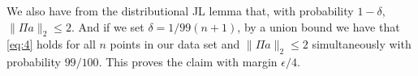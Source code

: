 \documentclass[11pt]{article}
\newcommand{\bv}[1]{\mathbf{#1}}
\begin{document}
	
	We also have from the distributional JL lemma that, with probability $1 - \delta$, $\|\Pi a\|_2 \leq 2$. And if we set $\delta = 1/99(n+1)$, by a union bound we have that \eqref{eq:4} holds for all $n$ points in our data set and $\|\Pi a\|_2 \leq 2$ simultaneously with probability $99/100$. This proves the claim with margin $\epsilon/4$. 
	
	
	
	
	
	
	
\end{document}
